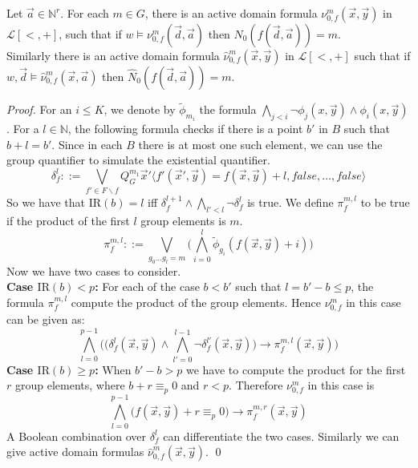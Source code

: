 \documentclass[envcountsame]{llncs}
\newcommand{\Nat}{\mathbb{N}}
\newcommand{\mon}[2]{Q_{#1}^{#2}}
\newcommand{\IR}{\mathrm{IR}}
\newcommand{\defs}{::=}
\begin{document}
\begin{lemma}\label{lem_formbase}
Let $\vec a \in \Nat^r$.  For each $m \in G$, there is an active domain formula $\nu^m_{0,f}(\vec x,\vec y)$ in $\mathcal L[<,+]$, 
such that if $w \models\nu^m_{0,f}(\vec d,\vec a)$ then $N_0(f(\vec d,\vec a))=m$. \\
Similarly there is an active domain formula $\hat \nu^m_{0,f}(\vec x,\vec y)$ in $\mathcal L[<,+]$ such that if  
$w,\vec d\models\hat \nu^m_{0,f}(\vec x,\vec a)$ then $\hat N_0(f(\vec d,\vec a))=m$.
\end{lemma}
\begin{proof}
  For an $i \leq K$, we denote by $\tilde \phi_{m_i}$ the formula $\bigwedge_{j<i} \neg \phi_j(x,\vec y) \wedge \phi_i(x,\vec y)$.
For a $l \in \Nat$, the following formula checks if there is a point $b'$ in $B$ such that $b+l=b'$. Since in each $B$ there is at most
one such element, we can use the group quantifier to simulate the existential quantifier.
$$\delta^l_{f} \defs \bigvee_{f'\in F \backslash f} \mon{G}{m_1} \vec x' \langle f'(\vec x',\vec y)=f(\vec x,\vec y)+l,false, \dots, false \rangle$$
So we have that $\IR(b)=l$ iff $\delta^{l+1}_f \wedge \bigwedge_{l'<l} \neg \delta^l_f$ is true. We define $\pi^{m,l}_f$ to be true if the product of the first $l$ group elements is $m$. 
$$\pi^{m,l}_f \defs \bigvee_{g_0\dots g_{l}=m}\bigg( \bigwedge_{i=0}^{l} \tilde \phi_{g_i}(f(\vec x,\vec y)+i)\bigg)$$
Now we have two cases to consider. \\
{\bf Case $\IR(b) < p$:} 
For each of the case $b<b'$ such that $l=b'-b \leq p$, the formula $\pi^{m,l}_f$ compute the product of the group elements. 
Hence $\nu^m_{0,f}$ in this case can be given as:
$$\bigwedge_{l=0}^{p-1} \bigg(\big(\delta^l_f(\vec x,\vec y) \wedge \bigwedge_{l'=0}^{l-1} \neg \delta^{l'}_f(\vec x,\vec y)\big) \rightarrow
\pi^{m,l}_f(\vec x,\vec y)\bigg)$$
{\bf Case $\IR(b) \geq p$:} 
When $b'-b > p$ we have to compute the product for the first $r$ group elements, where $b + r \equiv_p 0$ and $r<p$. Therefore
$\nu^m_{0,f}$ in this case is 
$$\bigwedge_{l=0}^{p-1} \big( f(\vec x,\vec y)+r \equiv_p 0 \big)\rightarrow \pi^{m,r}_f(\vec x,\vec y)$$
A Boolean combination over $\delta^l_f$ can differentiate the two cases.
Similarly we can give active domain formulas $\hat \nu^m_{0,f}(\vec x,\vec y)$.
\qed \end{proof}
\end{document}
